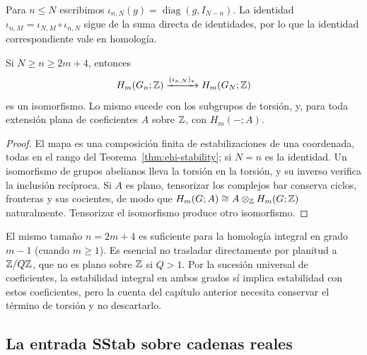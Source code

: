 Para $n\le N$ escribimos $\iota_{n,N}(g)=\operatorname{diag}(g,I_{N-n})$. La identidad $\iota_{n,M}=\iota_{N,M}\circ\iota_{n,N}$ sigue de la suma directa de identidades, por lo que la identidad correspondiente vale en homología.

\begin{proposicion}
\label{prop:ehi-iter}
Si $N\ge n\ge2m+4$, entonces
\begin{equation}
 H_m(G_n;\mathbb{Z})\xrightarrow{(\iota_{n,N})_*}H_m(G_N;\mathbb{Z})
 \label{eq:ehi-iter}
\end{equation}
es un isomorfismo. Lo mismo sucede con los subgrupos de torsión, y, para toda extensión plana de coeficientes $A$ sobre $\mathbb{Z}$, con $H_m(-;A)$.
\end{proposicion}
\begin{proof}
El mapa es una composición finita de estabilizaciones de una coordenada, todas en el rango del Teorema~\ref{thm:ehi-stability}; si $N=n$ es la identidad. Un isomorfismo de grupos abelianos lleva la torsión en la torsión, y su inverso verifica la inclusión recíproca. Si $A$ es plano, tensorizar los complejos bar conserva ciclos, fronteras y sus cocientes, de modo que $H_m(G;A)\cong A\otimes_{\mathbb{Z}} H_m(G;\mathbb{Z})$ naturalmente. Tensorizar el isomorfismo produce otro isomorfismo.
\end{proof}

El mismo tamaño $n=2m+4$ es suficiente para la homología integral en grado $m-1$ (cuando $m\ge1$). Es esencial no trasladar directamente por planitud a $\mathbb{Z}/Q\mathbb{Z}$, que no es plano sobre $\mathbb{Z}$ si $Q>1$. Por la sucesión universal de coeficientes, la estabilidad integral en ambos grados sí implica estabilidad con estos coeficientes, pero la cuenta del capítulo anterior necesita conservar el término de torsión y no descartarlo.

\subsection{La entrada SStab sobre cadenas reales}

